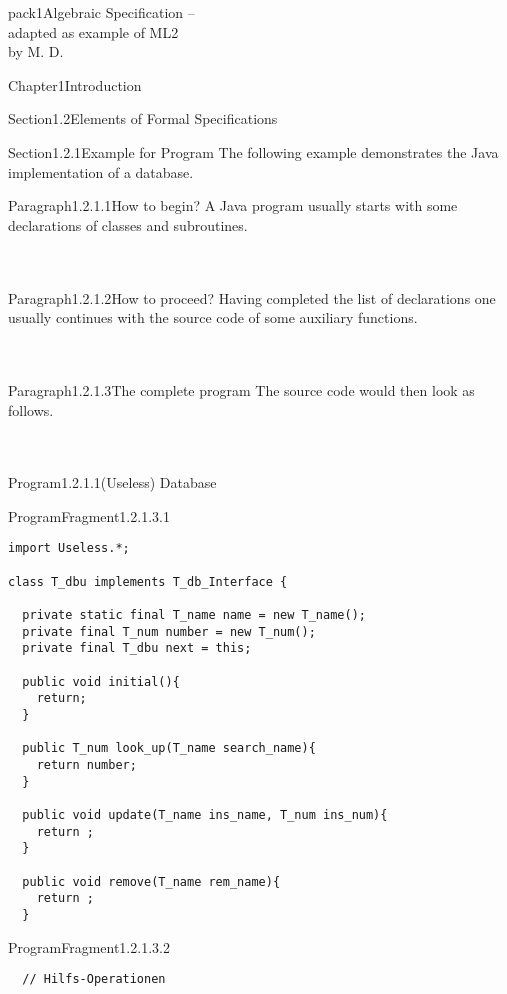 \documentclass[landscape, slides, light]{mmiss2}
\begin{document}
\begin{Package}{pack1}{Algebraic
Specification -- \\ adapted as example of ML2\\ by M. D.}
\begin{Section}{Chapter1}{Introduction}
\begin{Section}{Section1.2}{Elements of Formal Specifications}{}
\begin{Section}{Section1.2.1}{Example for Program}{}
The following example demonstrates the Java implementation of a
database.
\begin{Paragraph}{Paragraph1.2.1.1}{How to begin?}{}
A Java program usually starts with some declarations of classes and
subroutines.
\newline
\hfill \\
\hfill \\
\hfill \\
\end{Paragraph}
\begin{Paragraph}{Paragraph1.2.1.2}{How to proceed?}{}
Having completed the list of declarations one usually continues with
the source code of some auxiliary functions.
\newline
\hfill \\
\hfill \\
\hfill \\
\end{Paragraph}
\begin{Paragraph}{Paragraph1.2.1.3}{The complete program}{}
The source code would then look as follows.
\newline
\hfill \\
\hfill \\
\hfill \\
\begin{Program}{Program1.2.1.1}{(Useless) Database}{}
\begin{ProgramFragment}{ProgramFragment1.2.1.3.1}{}{}
\tiny
\begin{verbatim}
import Useless.*;

class T_dbu implements T_db_Interface {

  private static final T_name name = new T_name();
  private final T_num number = new T_num();
  private final T_dbu next = this;

  public void initial(){
    return;
  }

  public T_num look_up(T_name search_name){
    return number;
  }

  public void update(T_name ins_name, T_num ins_num){
    return ;
  }

  public void remove(T_name rem_name){
    return ;
  }

\end{verbatim}
\normalsize
\end{ProgramFragment}
\begin{ProgramFragment}{ProgramFragment1.2.1.3.2}{}{}
\tiny
\begin{verbatim}
  // Hilfs-Operationen


\end{verbatim}
\end{ProgramFragment}
\end{Program}
\end{Paragraph}
\end{Section}
\end{Section}
\end{Section}
\end{Package}
\end{document}
